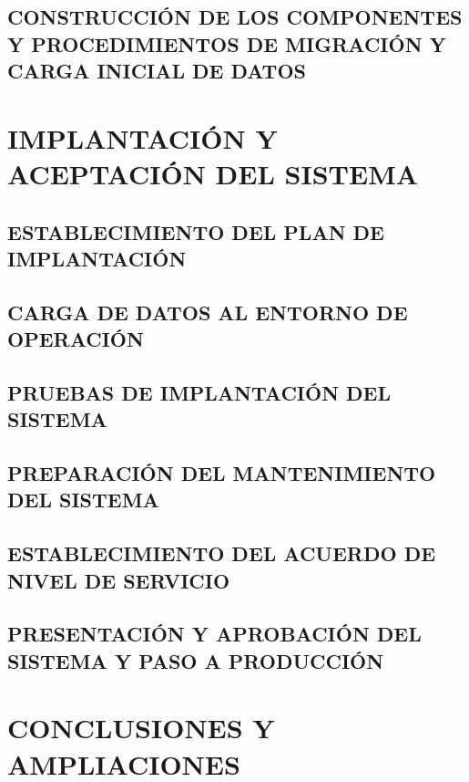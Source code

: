 \documentclass[11pt]{report} %
\begin{document}
\newpage
\section{CONSTRUCCIÓN DE LOS COMPONENTES Y PROCEDIMIENTOS DE MIGRACIÓN Y CARGA INICIAL DE DATOS}



\newpage
\chapter{IMPLANTACIÓN Y ACEPTACIÓN DEL SISTEMA}
\noindent{}

\newpage

\section{ESTABLECIMIENTO DEL PLAN DE IMPLANTACIÓN}


\newpage
\section{CARGA DE DATOS AL ENTORNO DE OPERACIÓN}


\newpage
\section{PRUEBAS DE IMPLANTACIÓN DEL SISTEMA}


\newpage
\section{PREPARACIÓN DEL MANTENIMIENTO DEL SISTEMA}


\newpage
\section{ESTABLECIMIENTO DEL ACUERDO DE NIVEL DE SERVICIO}


\newpage
\section{PRESENTACIÓN Y APROBACIÓN DEL SISTEMA Y PASO A PRODUCCIÓN}


\newpage
\chapter{CONCLUSIONES Y AMPLIACIONES}
\noindent{}
\newpage
\end{document}
